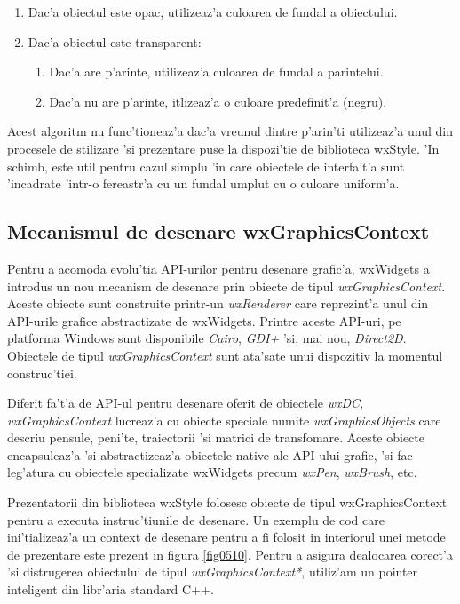 \begin{enumerate}
\item Dac'a obiectul este opac, utilizeaz'a culoarea de fundal a obiectului.
\item Dac'a obiectul este transparent:
	\begin{enumerate}
	\item Dac'a are p'arinte, utilizeaz'a culoarea de fundal a parintelui.
	\item Dac'a nu are p'arinte, itlizeaz'a o culoare predefinit'a (negru).
	\end{enumerate}
\end{enumerate}

Acest algoritm nu func'tioneaz'a dac'a vreunul dintre p'arin'ti utilizeaz'a unul din procesele de stilizare 'si prezentare puse la dispozi'tie de biblioteca wxStyle. 'In schimb, este util pentru cazul simplu 'in care obiectele de interfa't'a sunt 'incadrate 'intr-o fereastr'a cu un fundal umplut cu o culoare uniform'a.

\subsection{Mecanismul de desenare wxGraphicsContext}

Pentru a acomoda evolu'tia API-urilor pentru desenare grafic'a, wxWidgets a introdus un nou mecanism de desenare prin obiecte de tipul \emph{wxGraphicsContext}. Aceste obiecte sunt construite printr-un \emph{wxRenderer} care reprezint'a unul din API-urile grafice abstractizate de wxWidgets. Printre aceste API-uri, pe platforma Windows sunt disponibile \emph{Cairo}, \emph{GDI+} 'si, mai nou, \emph{Direct2D}. Obiectele de tipul \emph{wxGraphicsContext} sunt ata'sate unui dispozitiv la momentul construc'tiei.

\medskip

Diferit fa't'a de API-ul pentru desenare oferit de obiectele \emph{wxDC}, \emph{wxGraphicsContext} lucreaz'a cu obiecte speciale numite \emph{wxGraphicsObjects} care descriu pensule, peni'te, traiectorii 'si matrici de transfomare. Aceste obiecte encapsuleaz'a 'si abstractizeaz'a obiectele native ale API-ului grafic, 'si fac leg'atura cu obiectele specializate wxWidgets precum \emph{wxPen}, \emph{wxBrush}, etc.

\medskip

Prezentatorii din biblioteca wxStyle folosesc obiecte de tipul wxGraphicsContext pentru a executa instruc'tiunile de desenare. Un exemplu de cod care ini'tializeaz'a un context de desenare pentru a fi folosit in interiorul unei metode de prezentare este prezent in figura \ref{fig0510}. Pentru a asigura dealocarea corect'a 'si distrugerea obiectului de tipul \emph{wxGraphicsContext*}, utiliz'am un pointer inteligent din libr'aria standard C++.

